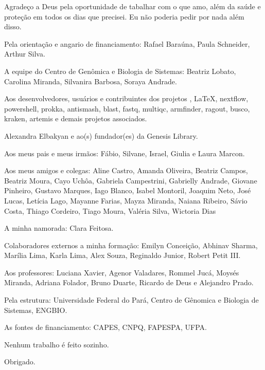 \begin{agradecimentos}

Agradeço a Deus pela oportunidade de tabalhar com o que amo, além da saúde e proteção em todos os dias
que precisei. Eu não poderia pedir por nada além disso.

Pela orientação e angario de financiamento: Rafael Baraúna, Paula Schneider, Arthur Silva. 

A equipe do Centro de Genômica e Biologia de Sistemas: Beatriz Lobato, Carolina Miranda, Silvanira Barbosa,
Soraya Andrade. 

Aos desenvolvedores, usuários e contribuintes dos projetos \abnTeX, \LaTeX, nextflow, powershell, 
prokka, antismash, blast, fastq, multiqc, armfinder, ragout, busco, kraken, artemis e demais projetos
associados.

Alexandra Elbakyan e ao(s) fundador(es) da Genesis Library.

Aos meus pais e meus irmãos: Fábio, Silvane, Israel, Giulia e Laura Marcon.

Aos meus amigos e colegas: Aline Castro, Amanda Oliveira, Beatriz Campos, Beatriz Moura, Cayo Uchôa, 
Gabriela Campestrini, Gabrielly Andrade, Giovane Pinheiro, Gustavo Marques, Iago Blanco, 
Isabel Montoril, Joaquim Neto, José Lucas, Letícia Lago, Mayanne Farias, Mayza Miranda, 
Naiana Ribeiro, Sávio Costa, Thiago Cordeiro, Tiago Moura, Valéria Silva, Wictoria Dias

A minha namorada: Clara Feitosa.

Colaboradores externos a minha formação: Emilyn Conceição, Abhinav Sharma, Marília Lima, Karla Lima, Alex Souza, Reginaldo Junior, Robert Petit III.

Aos professores: Luciana Xavier, Agenor Valadares, Rommel Jucá, Moysés Miranda, Adriana Folador,
Bruno Duarte, Ricardo de Deus e Alejandro Prado.

Pela estrutura: Universidade Federal do Pará, Centro de Gênomica e Biologia de Sistemas, ENGBIO.

As fontes de financiamento: CAPES, CNPQ, FAPESPA, UFPA.

Nenhum trabalho é feito sozinho.

Obrigado.

\end{agradecimentos}
